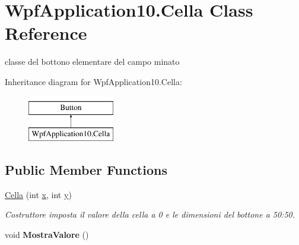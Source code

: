 \hypertarget{class_wpf_application10_1_1_cella}{}\section{Wpf\+Application10.\+Cella Class Reference}
\label{class_wpf_application10_1_1_cella}


classe del bottono elementare del campo minato  


Inheritance diagram for Wpf\+Application10.\+Cella\+:\begin{figure}[H]
\begin{center}
\leavevmode
\includegraphics[height=2.000000cm]{class_wpf_application10_1_1_cella}
\end{center}
\end{figure}
\subsection*{Public Member Functions}
\begin{DoxyCompactItemize}
\item 
\mbox{\label{class_wpf_application10_1_1_cella_a862cd54e4059b6b1d5f01d530b56b54d}} 
\hyperlink{class_wpf_application10_1_1_cella_a862cd54e4059b6b1d5f01d530b56b54d}{Cella} (int \hyperlink{class_wpf_application10_1_1_cella_a6f0eb1102ff02ab27e3767c5c5852598}{x}, int \hyperlink{class_wpf_application10_1_1_cella_a2b648fcacbaf4ec37274633409f00e5e}{y})
\begin{DoxyCompactList}\small\item\em Costruttore imposta il valore della cella a 0 e le dimensioni del bottone a 50\+:50. \end{DoxyCompactList}\item 
\mbox{\label{class_wpf_application10_1_1_cella_adc88e8ad6e5b9b34f5915e338c7a9fd7}} 
void {\bfseries Mostra\+Valore} ()
\end{DoxyCompactItemize}
